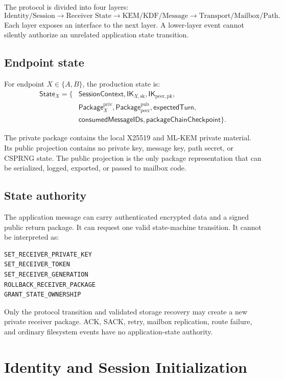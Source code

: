 \documentclass[11pt,letterpaper]{article}
\newcommand{\State}{\mathsf{State}}
\begin{document}
The protocol is divided into four layers:
\[
\text{Identity/Session}
\rightarrow
\text{Receiver State}
\rightarrow
\text{KEM/KDF/Message}
\rightarrow
\text{Transport/Mailbox/Path}.
\]
Each layer exposes an interface to the next layer. A lower-layer event cannot silently
authorize an unrelated application state transition.

\subsection{Endpoint state}

For endpoint $X \in \{A,B\}$, the production state is:
\begin{align*}
  \State_X = \{&\mathsf{SessionContext},
  \mathsf{IK}_{X,\mathrm{sk}},
  \mathsf{IK}_{\mathrm{peer},\mathrm{pk}},\\
  &\mathsf{Package}^{\mathrm{priv}}_X,
  \mathsf{Package}^{\mathrm{pub}}_{\mathrm{peer}},
  \mathsf{expectedTurn},\\
  &\mathsf{consumedMessageIDs},
  \mathsf{packageChainCheckpoint}\}.
\end{align*}

The private package contains the local X25519 and ML-KEM private material. Its public
projection contains no private key, message key, path secret, or CSPRNG state. The public
projection is the only package representation that can be serialized, logged, exported,
or passed to mailbox code.

\subsection{State authority}

The application message can carry authenticated encrypted data and a signed public return
package. It can request one valid state-machine transition. It cannot be interpreted as:

\begin{lstlisting}[caption={Forbidden interpretations of an application message}]
SET_RECEIVER_PRIVATE_KEY
SET_RECEIVER_TOKEN
SET_RECEIVER_GENERATION
ROLLBACK_RECEIVER_PACKAGE
GRANT_STATE_OWNERSHIP
\end{lstlisting}

Only the protocol transition and validated storage recovery may create a new private
receiver package. ACK, SACK, retry, mailbox replication, route failure, and ordinary
filesystem events have no application-state authority.

\section{Identity and Session Initialization}
\label{sec:initialization}
\end{document}
